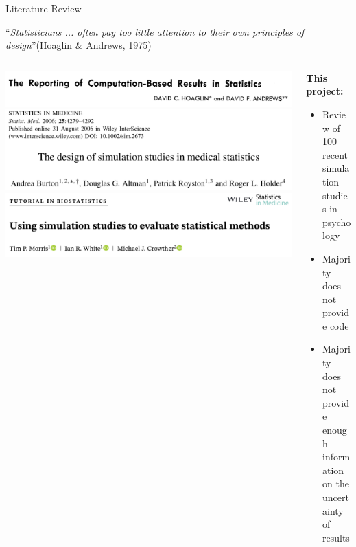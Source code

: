 \documentclass[english, 12pt, aspectratio=169]{beamer}
\begin{document}
\begin{frame}{Literature Review}
\begin{tcolorbox}[colframe=chineseBlue]
            ``\emph{Statisticians ... often pay too little attention to their own principles of design}''(Hoaglin \& Andrews, 1975)
          \end{tcolorbox}
          \vspace{-1em}
  \begin{columns}
    \begin{column}{0.5\textwidth}
      \begin{block}{}
          \centering
          \includegraphics[width = 0.8\linewidth,frame]{pics/hoaglin.png}
          \includegraphics[width = 0.8\linewidth,frame]{pics/burton.png}
          \includegraphics[width = 0.8\linewidth,frame]{pics/morris.png}
          \nocite{Hoaglin1975}
          \pause
      \end{block}
    \end{column}
    \begin{column}{0.5\textwidth}
      \begin{block}{}
      \textbf{This project:}
      \pause
        \begin{itemize}
          \item Review of \alert{100 recent simulation studies} in psychology
          \pause
          \item Majority does not provide code
          \pause
          \item Majority does not provide enough information on the uncertainty of results
        \end{itemize}
      \end{block}
      \end{column}
    \end{columns}
\end{frame}
\end{document}
